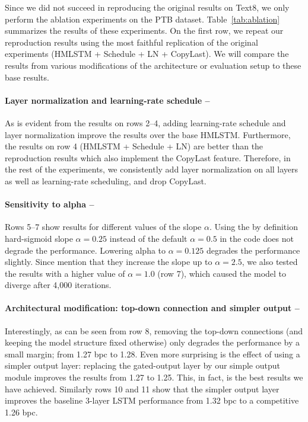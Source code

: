 Since we did not succeed in reproducing the original results 
on Text8, we only perform the ablation experiments on the 
PTB dataset. Table~\ref{tab:ablation} summarizes the results 
of these experiments. On the first row, we repeat our reproduction 
results using the most faithful replication of the original 
experiments (HMLSTM + Schedule + LN + CopyLast). We will 
compare the results from various modifications of the 
architecture or evaluation setup to these base results.

\paragraph{Layer normalization and learning-rate schedule --} 
As is evident from the results on rows 2--4, adding 
learning-rate schedule and layer normalization improve 
the results over the base HMLSTM. Furthermore, the 
results on row 4 (HMLSTM + Schedule + LN) are better 
than the reproduction results which also implement the 
CopyLast feature. Therefore, in the rest of the experiments, 
we consistently add layer normalization on all layers as 
well as learning-rate scheduling, and drop CopyLast.

\paragraph{Sensitivity to alpha --}
Rows 5--7 show results for different values of the slope 
$\alpha$. Using the by definition hard-sigmoid slope $\alpha=0.25$ 
instead of the default $\alpha=0.5$ in the code does not degrade 
the performance. Lowering alpha to $\alpha=0.125$ degrades 
the performance slightly. Since \cite{chung2016hierarchical} 
mention that they increase the slope up to $\alpha=2.5$, we 
also tested the results with a higher value of $\alpha=1.0$ (row 7), 
which caused the model to diverge after 4,000 iterations.

\paragraph{Architectural modification: top-down connection and simpler output --} Interestingly, as can be seen from row 8, removing the top-down 
connections (and keeping the model structure fixed otherwise) only 
degrades the performance by a small margin; from 1.27 bpc to 1.28. 
Even more surprising is the effect of using a simpler output layer:
replacing the gated-output layer by our simple output module improves the results from 1.27 to 1.25. This, in fact, is the 
best results we have achieved. Similarly rows 10 and 11 show that the simpler output layer improves the baseline 
3-layer LSTM performance from 1.32 bpc to a competitive 1.26 bpc.

